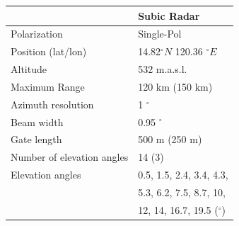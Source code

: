 \begin{multicols}{2}
\noindent
\begin{minipage}[t]{0.45\textwidth}
\begin{center}
\label{tab:techspecs}
\begin{tabular}{l l}
\hline
                             & Subic Radar                                                                                                    \\ \hline
Polarization                 & Single-Pol                                                                                                     \\
Position (lat/lon)           & 14.82$^{\circ} N$ 120.36 $^{\circ} E$                                                                            \\
Altitude 		             & 532 m.a.s.l.                                                                                                           \\
Maximum Range                & 120 km (150 km)                                                                                                         \\
Azimuth resolution           & 1 $^{\circ}$                                                                                                    \\
Beam width                   & 0.95 $^{\circ}$                                                                                                    \\
Gate length                  & 500 m (250 m)                                                                                                          \\
Number of elevation angles   & 14 (3)                                                                                                            \\
\hline
Elevation angles             & 0.5, 1.5, 2.4, 3.4, 4.3, \\
& 5.3, 6.2, 7.5, 8.7, 10, \\ & 12, 14, 16.7, 19.5 ($^{\circ}$) \\ 

\end{tabular}
\end{center}
\end{minipage}
\end{multicols}
